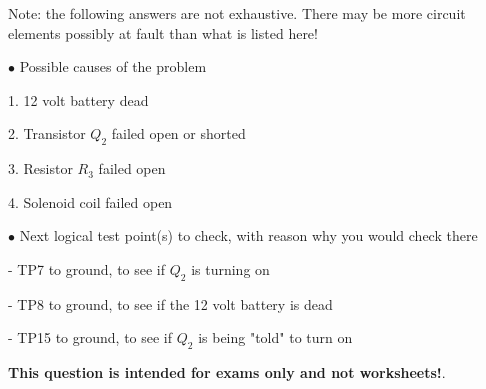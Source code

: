Note: the following answers are not exhaustive.  There may be more circuit elements possibly at fault than what is listed here!

\medskip
\goodbreak
\item{$\bullet$} Possible causes of the problem
\item{1.} 12 volt battery dead
\item{2.} Transistor $Q_2$ failed open or shorted
\item{3.} Resistor $R_3$ failed open
\item{4.} Solenoid coil failed open
\medskip

\medskip
\goodbreak
\item{$\bullet$} Next logical test point(s) to check, with reason why you would check there
\item{-} TP7 to ground, to see if $Q_2$ is turning on
\item{-} TP8 to ground, to see if the 12 volt battery is dead
\item{-} TP15 to ground, to see if $Q_2$ is being "told" to turn on
\medskip







{\bf This question is intended for exams only and not worksheets!}.





